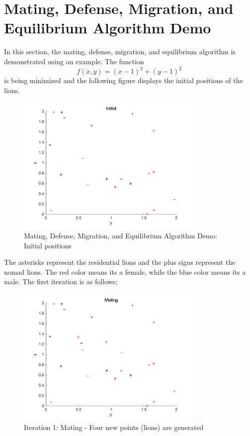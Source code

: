\section{Mating, Defense, Migration, and Equilibrium Algorithm Demo}
In this section, the mating, defense, migration, and equilibrium algorithm is demonstrated using an example. The function $$f(x,y)=(x-1)^2 + (y-1)^2$$ is being minimized and the following figure displays the initial positions of the lions. 
\begin{figure}[H]
\begin{center}
\includegraphics[width=0.8\textwidth]{img/mdme/init}
\caption{Mating, Defense, Migration, and Equilibrium Algorithm Demo: Initial positions}
\end{center}
\end{figure}
The asterisks represent the residential lions and the plus signs represent the nomad lions. The red color means its a female, while the blue color means its a male. The first iteration is as follows:

\begin{figure}[H]
\begin{center}
\includegraphics[width=0.8\textwidth]{img/mdme/mating1}
\caption{Iteration 1: Mating - Four new points (lions) are generated}
\end{center}
\end{figure}

